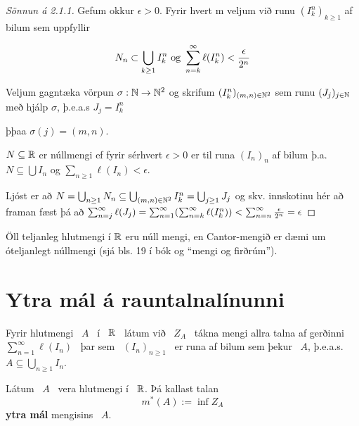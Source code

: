 \documentclass[12pt]{report}
\begin{document}
\begin{proof}[Sönnun á 2.1.1]

  Gefum okkur $\epsilon > 0$. Fyrir hvert m veljum við runu
  $(I^n_k)_{k \geq 1}$ af bilum sem uppfyllir

  \[N_n \subset \bigcup_{k \geq 1} I_k^n \text{ og } \sum_{n = {k}}^{\infty}
  \ell(I^n_k) < \frac{\epsilon}{2^n}\]

  Veljum gagntæka vörpun $\sigma: \mathbb{N} \to \mathbb{N}^2$ og skrifum
  $(I^n_k)_{(m,n) \in \mathbb{N}^2}$ sem runu $(J_j)_{j \in \mathbb{N}}$ með hjálp
  $\sigma$, þ.e.a.s $J_j = I^n_k$

  þþaa $\sigma (j) = (m,n)$.

\begin{ath}
  $N \subseteq \mathbb{R}$ er núllmengi ef fyrir sérhvert $\epsilon > 0$ er
  til runa $(I_n)_{n}$ af bilum þ.a.  $N \subseteq \bigcup I_n$ og
  $\sum_{n \geq 1} \ell(I_n) < \epsilon$.

\end{ath}

Ljóst er að
$N = \bigcup_{n \geq 1} N_n \subseteq \bigcup_{(m,n) \in \mathbb{N}^2} I^n_k =
\bigcup_{j \geq 1} J_j$
og skv. innskotinu hér að framan fæst þá að
$\sum_{n = {j}}^{\infty} \ell(J_j) = \sum_{n = 1}^{\infty} ( \sum_{n = {k}}^{\infty} \ell(I_k^n)) <
\sum_{n = {n}}^{\infty} \frac{\epsilon}{2^n} = \epsilon$

\end{proof}

\begin{daemi}

  Öll teljanleg hlutmengi í $\mathbb{R}$ eru núll mengi, en Cantor-mengið er
  dæmi um óteljanlegt núllmengi (sjá bls. 19 í bók og ``mengi og
  firðrúm'').
\end{daemi}


\section{Ytra mál á rauntalnalínunni}
Fyrir hlutmengi \ $A$ \ í \ $\mathbb{R}$ \ látum við \ $Z_A$ \ tákna mengi allra talna af gerðinni \ $\sum\limits_{n=1}^{\infty}\ell(I_n)$ \ þar sem \ $(I_n)_{n\geq 1}$ \ er runa af bilum sem þekur \ $A$, þ.e.a.s. \ $A\subseteq\bigcup_{n\geq 1}I_n$.


\begin{skgr*}
Látum  \ $A$ \ vera hlutmengi í   \ $\mathbb{R}$. Þá kallast talan 
$$
m^*(A) := \inf Z_A
$$
{\bf ytra mál} mengisins \ $A$.
\end{skgr*}
\end{document}
